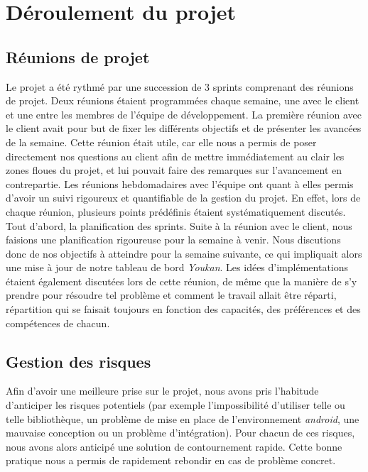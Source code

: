 \section{Déroulement du projet}

\subsection{Réunions de projet}

Le projet a été rythmé par une succession de 3 sprints comprenant des réunions de projet.
Deux réunions étaient programmées chaque semaine, une avec le client et une entre les membres de l'équipe de développement.
La première réunion avec le client avait pour but de fixer les différents objectifs et de présenter les avancées de la semaine. Cette réunion était utile, car elle nous a permis de poser directement nos questions au client afin de mettre immédiatement au clair les zones floues du projet, et lui pouvait faire des remarques sur l'avancement en contrepartie. Les réunions hebdomadaires avec l'équipe ont quant à elles permis d'avoir un suivi rigoureux et quantifiable de la gestion du projet. En effet, lors de chaque réunion, plusieurs points prédéfinis étaient systématiquement discutés.  
Tout d'abord, la planification des sprints. Suite à la réunion avec le client, nous faisions une planification rigoureuse pour la semaine à venir. Nous discutions donc de nos objectifs à atteindre pour la semaine suivante, ce qui impliquait alors une mise à jour de notre tableau de bord \emph{Youkan}. Les idées d'implémentations étaient également discutées lors de cette réunion, de même que la manière de s'y prendre pour résoudre tel problème et comment le travail allait être réparti, répartition qui se faisait toujours en fonction des capacités, des préférences et des compétences de chacun. 

\subsection{Gestion des risques}

Afin d'avoir une meilleure prise sur le projet, nous avons pris l'habitude d'anticiper les risques potentiels (par exemple l'impossibilité d'utiliser telle ou telle bibliothèque, un problème de mise en place de l'environnement \emph{android}, une mauvaise conception ou un problème d'intégration). Pour chacun de ces risques, nous avons alors anticipé une solution de contournement rapide. Cette bonne pratique nous a permis de rapidement rebondir en cas de problème concret.    


